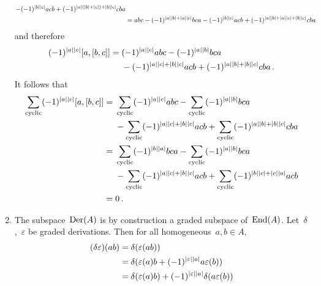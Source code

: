 \documentclass[a4paper,10pt,headings=standardclasses]{scrartcl}
\begin{document}
\begin{enumerate}
\begin{align*}
      - (-1)^{\lvert b\rvert \lvert c\rvert} acb
      + (-1)^{\lvert a\rvert (\lvert b\rvert + \lvert c\rvert) + \lvert b\rvert \lvert c\rvert} cba
      \\
      &=
        abc
      - (-1)^{\lvert a\rvert \lvert b\rvert + \lvert a\rvert \lvert c\rvert} bca
      - (-1)^{\lvert b\rvert \lvert c\rvert} acb
      + (-1)^{\lvert a\rvert \lvert b\rvert + \lvert a\rvert \lvert c\rvert + \lvert b\rvert \lvert c\rvert} cba
    \end{align*}
    \endgroup
    and therefore
    \begin{align*}
      (-1)^{\lvert a\rvert \lvert c\rvert} [a,[b,c]]
      ={}&
        (-1)^{\lvert a\rvert \lvert c\rvert} abc
      - (-1)^{\lvert a\rvert \lvert b\rvert} bca
      \\
      {}&
      - (-1)^{\lvert a\rvert \lvert c\rvert + \lvert b\rvert \lvert c\rvert} acb
      + (-1)^{\lvert a\rvert \lvert b\rvert + \lvert b\rvert \lvert c\rvert} cba \,.
    \end{align*}
    It follows that
    \begin{align*}
      \sum_{\text{cyclic}}
      (-1)^{\lvert a\rvert \lvert c\rvert} [a,[b,c]]
      ={}&
        \sum_{\text{cyclic}} (-1)^{\lvert a\rvert \lvert c\rvert} abc
      - \sum_{\text{cyclic}} (-1)^{\lvert a\rvert \lvert b\rvert} bca
      \\
      {}&
      - \sum_{\text{cyclic}} (-1)^{\lvert a\rvert \lvert c\rvert + \lvert b\rvert \lvert c\rvert} acb
      + \sum_{\text{cyclic}} (-1)^{\lvert a\rvert \lvert b\rvert + \lvert b\rvert \lvert c\rvert} cba
      \\
      ={}&
        \sum_{\text{cyclic}} (-1)^{\lvert b\rvert \lvert a\rvert} bca
      - \sum_{\text{cyclic}} (-1)^{\lvert a\rvert \lvert b\rvert} bca
      \\
      {}&
      - \sum_{\text{cyclic}} (-1)^{\lvert a\rvert \lvert c\rvert + \lvert b\rvert \lvert c\rvert} acb
      + \sum_{\text{cyclic}} (-1)^{\lvert b\rvert \lvert c\rvert + \lvert c\rvert \lvert a\rvert} acb
      \\
      ={}&
      0 \,.
    \end{align*}
  \item
    The subspace~$\operatorname{Der}(A)$ is by construction a graded subspace of~$\operatorname{End}(A)$.
    Let~$\delta$,~$\varepsilon$ be graded derivations.
    Then for all homogeneous~$a, b \in A$,
    \begingroup
    \allowdisplaybreaks
    \begin{align*}
      (\delta \varepsilon)(ab)
      ={}&
      \delta( \varepsilon(ab) )
      \\
      ={}&
      \delta( \varepsilon(a) b + (-1)^{\hdeg{\varepsilon} \hdeg{a}} a \varepsilon(b) )
      \\
      ={}&
        \delta( \varepsilon(a) b )
      + (-1)^{\hdeg{\varepsilon} \hdeg{a}}
        \delta( a \varepsilon(b) )
      \\

\end{align*}
\end{enumerate}
\end{document}
